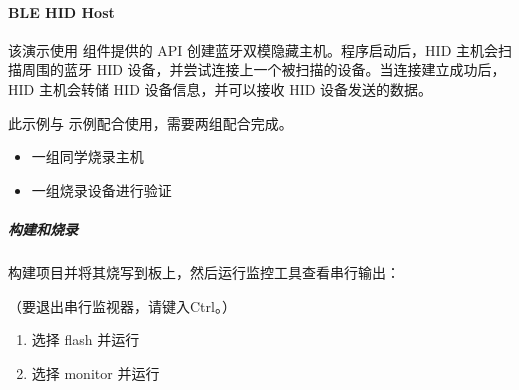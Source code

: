 \documentclass[a4paper,12pt,english]{sphinxmanual}
\begin{document}
{{\paragraph{BLE HID Host}
\label{\detokenize{exp-esp32/bluetooth/hid-gap:ble-hid-host}}
\sphinxAtStartPar
该演示使用  组件提供的 API 创建蓝牙双模隐藏主机。程序启动后，HID 主机会扫描周围的蓝牙 HID 设备，并尝试连接上一个被扫描的设备。当连接建立成功后，HID 主机会转储 HID 设备信息，并可以接收 HID 设备发送的数据。

\sphinxAtStartPar
此示例与  示例配合使用，需要两组配合完成。
\begin{itemize}
\item {} 
\sphinxAtStartPar
一组同学烧录主机

\item {} 
\sphinxAtStartPar
一组烧录设备进行验证

\end{itemize}


\subparagraph{构建和烧录}
\label{\detokenize{exp-esp32/bluetooth/hid-gap:id4}}
\sphinxAtStartPar
构建项目并将其烧写到板上，然后运行监控工具查看串行输出：

\sphinxAtStartPar
{}

\sphinxAtStartPar
{} （要退出串行监视器，请键入Ctrl\sphinxhyphen{}{]}。）

\sphinxAtStartPar
{}
\begin{enumerate}
%
\item {} 
\sphinxAtStartPar
选择 flash 并运行

\item {} 
\sphinxAtStartPar
选择 monitor 并运行

\end{enumerate}


}}
\end{document}
